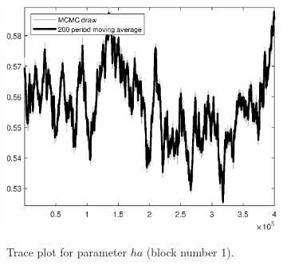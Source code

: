\begin{figure}[H]
\centering
  \includegraphics[width=0.8\textwidth]{BRS_growth/graphs/TracePlot_ha_blck_1}\\
    \caption{Trace plot for parameter ${ha}$ (block number 1).}
\end{figure}
